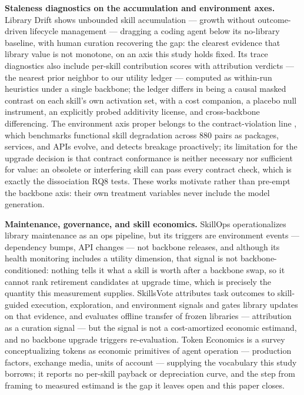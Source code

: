 \documentclass[11pt]{article}
\begin{document}
\textbf{Staleness diagnostics on the accumulation and environment axes.} Library Drift \citep{LibraryDrift2026} shows unbounded skill accumulation --- growth without outcome-driven lifecycle management --- dragging a coding agent below its no-library baseline, with human curation recovering the gap: the clearest evidence that library value is not monotone, on an axis this study holds fixed. Its trace diagnostics also include per-skill contribution scores with attribution verdicts --- the nearest prior neighbor to our utility ledger --- computed as within-run heuristics under a single backbone; the ledger differs in being a causal masked contrast on each skill's own activation set, with a cost companion, a placebo null instrument, an explicitly probed additivity license, and cross-backbone differencing. The environment axis proper belongs to the contract-violation line \citep{SkillGuard2026}, which benchmarks functional skill degradation across 880 pairs as packages, services, and APIs evolve, and detects breakage proactively; its limitation for the upgrade decision is that contract conformance is neither necessary nor sufficient for value: an obsolete or interfering skill can pass every contract check, which is exactly the dissociation RQ8 tests. These works motivate rather than pre-empt the backbone axis: their own treatment variables never include the model generation.

\textbf{Maintenance, governance, and skill economics.} SkillOps \citep{SkillOps2026} operationalizes library maintenance as an ops pipeline, but its triggers are environment events --- dependency bumps, API changes --- not backbone releases, and although its health monitoring includes a utility dimension, that signal is not backbone-conditioned: nothing tells it what a skill is worth after a backbone swap, so it cannot rank retirement candidates at upgrade time, which is precisely the quantity this measurement supplies. SkillsVote \citep{SkillsVote2026} attributes task outcomes to skill-guided execution, exploration, and environment signals and gates library updates on that evidence, and evaluates offline transfer of frozen libraries --- attribution as a curation signal --- but the signal is not a cost-amortized economic estimand, and no backbone upgrade triggers re-evaluation. Token Economics \citep{TokenEconomics2026} is a survey conceptualizing tokens as economic primitives of agent operation --- production factors, exchange media, units of account --- supplying the vocabulary this study borrows; it reports no per-skill payback or depreciation curve, and the step from framing to measured estimand is the gap it leaves open and this paper closes.
\end{document}
